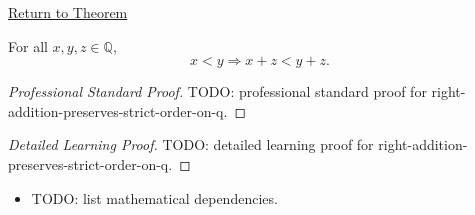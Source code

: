 \newpage
{}
\label{prf:right-addition-preserves-strict-order-on-q}

\begin{remark*}[Return]
\hyperref[cor:right-addition-preserves-strict-order-on-q]{Return to Theorem}
\end{remark*}

\begin{corollary*}
For all $x,y,z\in\mathbb{Q}$,
\[
x<y \Longrightarrow x+z<y+z.
\]
\end{corollary*}

\begin{proof}[Professional Standard Proof]
\LRAProofBodyStart
TODO: professional standard proof for right-addition-preserves-strict-order-on-q.
\end{proof}

\begin{proof}[Detailed Learning Proof]
\LRAProofBodyStart
TODO: detailed learning proof for right-addition-preserves-strict-order-on-q.
\end{proof}

\begin{remark*}
\end{remark*}

\begin{dependencies}
\begin{itemize}
  \item TODO: list mathematical dependencies.
\end{itemize}
\end{dependencies}

\clearpage
